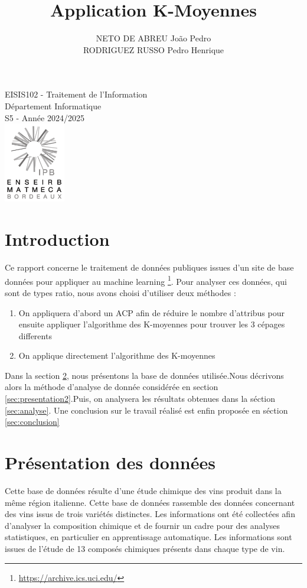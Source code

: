 \documentclass[a4paper,12pt]{article}
\title{Application K-Moyennes}
\author{NETO DE ABREU Jo\~ao Pedro \\ RODRIGUEZ RUSSO Pedro Henrique}
\date{}
\begin{document}
\maketitle

\begin{center}
  \large
  EISIS102 - Traitement de l'Information \\
  Département Informatique\\
  S5 - Année 2024/2025\\
  \vfill
  \includegraphics[width=0.2\textwidth]{enseirb-matmeca.png}
\end{center}

\newpage

\tableofcontents

\newpage

\section{Introduction}
Ce rapport concerne le traitement de données publiques issues d'un site de base données pour appliquer au machine learning \footnote{\url{https://archive.ics.uci.edu/}}. Pour analyser ces données, qui sont de types ratio, nous avons choisi d'utiliser deux méthodes :\\
\begin{enumerate}
\item On appliquera d'abord un ACP afin de réduire le nombre d'attribus pour ensuite appliquer l'algorithme des K-moyennes pour trouver les 3 cépages differents\\
\item On applique directement l'algorithme des K-moyennes
\end{enumerate}
\vspace{1cm}
Dans la section \ref{sec:presentation1}, nous présentons la base de données utilisée.Nous décrivons alors la méthode d'analyse de donnée considérée en section \ref{sec:presentation2}.Puis, on analysera les résultats obtenues dans la séction \ref{sec:analyse}. Une conclusion sur le travail réalisé est enfin proposée en séction \ref{sec:conclusion}

\section{Présentation des données}
\label{sec:presentation1}
Cette base de données résulte d'une étude chimique des vins produit dans la même région italienne. Cette base de données rassemble des données concernant des vins issus de trois variétés distinctes. Les informations ont été collectées afin d'analyser la composition chimique et de fournir un cadre pour des analyses statistiques, en particulier en apprentissage automatique. Les informations sont issues de l'étude de 13 composés chimiques présents dans chaque type de vin.
\end{document}
